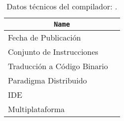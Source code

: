 \begin{table}[h]

\begin{center}

\begin{tabular}{|l|l|}\hline
\multicolumn{2}{|c|}{\texttt{Name}}\\ 
\hline
\hline
Fecha de Publicación &  \\ \hline
Conjunto de Instrucciones &   \\ \hline
Traducción a Código Binario &   \\ \hline
Paradigma Distribuido &   \\ \hline
IDE &  \\ \hline
Multiplataforma &   \\ \hline
\end{tabular}

\caption{Datos técnicos del compilador: \texttt{}.}

\end{center}

\end{table}